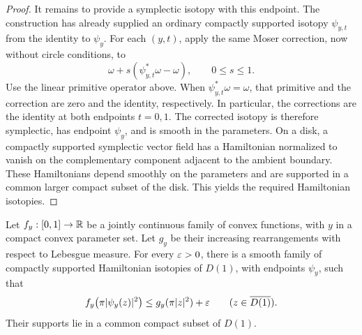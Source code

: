 \begin{proof}
It remains to provide a symplectic isotopy with this endpoint.
The construction has already supplied an ordinary compactly
supported isotopy \(\psi_{y,t}\) from the identity to \(\psi_y\).
For each \((y,t)\), apply the same Moser correction, now without
circle conditions, to
\[
 \omega+s(\psi_{y,t}^*\omega-\omega),\qquad 0\le s\le1.
\]
Use the linear primitive operator above. When
\(\psi_{y,t}^*\omega=\omega\), that primitive and the correction are
zero and the identity, respectively. In particular, the corrections
are the identity at both endpoints \(t=0,1\). The corrected isotopy
is therefore symplectic, has endpoint \(\psi_y\), and is smooth in
the parameters. On a disk, a compactly supported symplectic vector
field has a Hamiltonian normalized to vanish on the complementary
component adjacent to the ambient boundary. These Hamiltonians depend
smoothly on the parameters and are supported in a common larger compact
subset of the disk. This yields the required Hamiltonian isotopies.
\end{proof}

\begin{lemma}\label{cmp:disk-realization}
Let \(f_y:[0,1]\to\mathbb R\) be a jointly continuous family of convex
functions, with \(y\) in a compact convex parameter set. Let \(g_y\)
be their increasing rearrangements with respect to Lebesgue measure.
For every \(\varepsilon>0\), there is a smooth family of compactly supported
Hamiltonian isotopies of \(D(1)\), with endpoints \(\psi_y\), such that
\[
 f_y\bigl(\pi|\psi_y(z)|^2\bigr)
 \le g_y(\pi|z|^2)+\varepsilon
 \qquad(z\in\overline{D(1)}).
\]
Their supports lie in a common compact subset of \(D(1)\).
\end{lemma}

